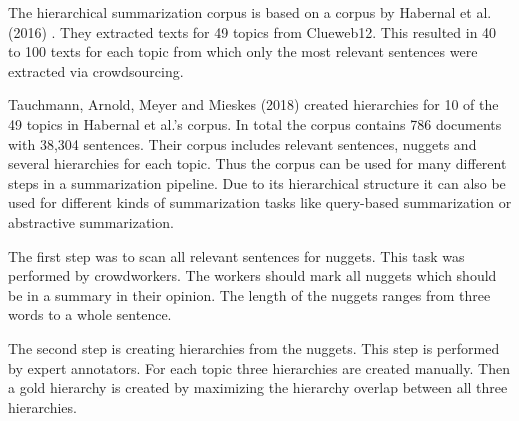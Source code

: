  
The hierarchical summarization corpus is based on a corpus by Habernal et al. (2016) \citep{Habernal:2016:NCA:2911451.2914682}. They extracted texts for 49 topics from Clueweb12. This resulted in 40 to 100 texts for each topic from which only the most relevant sentences were extracted via crowdsourcing.

Tauchmann, Arnold, Meyer and Mieskes (2018) created hierarchies for 10 of the 49 topics in Habernal et al.'s corpus. In total the corpus contains 786 documents with 38,304 sentences. Their corpus includes relevant sentences, nuggets and several hierarchies for each topic. Thus the corpus can be used for many different steps in a summarization pipeline. Due to its hierarchical structure it can also be used for different kinds of summarization tasks like query-based summarization or abstractive summarization.

The first step was to scan all relevant sentences for nuggets. This task was performed by crowdworkers. The workers should mark all nuggets which should be in a summary in their opinion. The length of the nuggets ranges from three words to a whole sentence.

The second step is creating hierarchies from the nuggets. This step is performed by expert annotators. For each topic three hierarchies are created manually. Then a gold hierarchy is created by maximizing the hierarchy overlap between all three hierarchies.